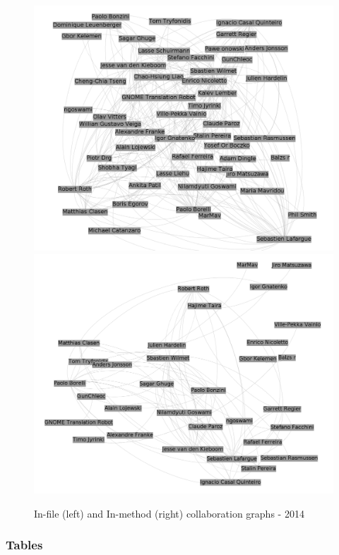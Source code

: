 \documentclass[a4paper]{article}
\begin{document}
\begin{figure}[ht]
\begin{center}
\includegraphics[scale=0.17]{g2014files.png} 
\includegraphics[scale=0.17]{g2014methods.png}
\caption{In-file (left) and In-method (right) collaboration graphs - 2014}
\label{fig:fixme2}
\end{center}
\end{figure}



\subsubsection{Tables}
\end{document}
